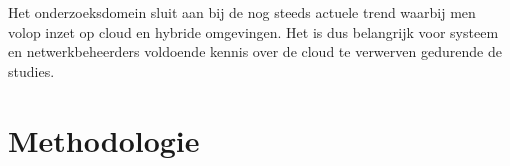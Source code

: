 Het onderzoeksdomein sluit aan bij de nog steeds actuele trend waarbij men volop inzet op cloud en hybride omgevingen. Het is dus belangrijk voor systeem en netwerkbeheerders voldoende kennis over de cloud te verwerven gedurende de studies. 








\section{Methodologie}%
\label{sec:methodologie}

